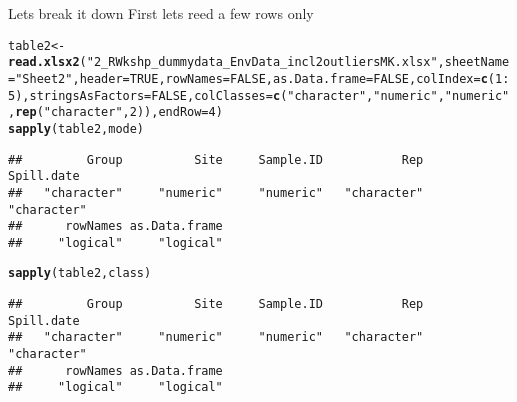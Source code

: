 \documentclass[12pt]{beamer}\usepackage[]{graphicx}\usepackage[]{color}
\makeatletter
\newcommand{\hlnum}[1]{\textcolor[rgb]{0.686,0.059,0.569}{#1}}%
\newcommand{\hlstr}[1]{\textcolor[rgb]{0.192,0.494,0.8}{#1}}%
\newcommand{\hlopt}[1]{\textcolor[rgb]{0,0,0}{#1}}%
\newcommand{\hlstd}[1]{\textcolor[rgb]{0.345,0.345,0.345}{#1}}%
\newcommand{\hlkwb}[1]{\textcolor[rgb]{0.69,0.353,0.396}{#1}}%
\newcommand{\hlkwc}[1]{\textcolor[rgb]{0.333,0.667,0.333}{#1}}%
\newcommand{\hlkwd}[1]{\textcolor[rgb]{0.737,0.353,0.396}{\textbf{#1}}}%
\newenvironment{kframe}{%
 \def\at@end@of@kframe{}%
 \ifinner\ifhmode%
  \def\at@end@of@kframe{\end{minipage}}%
  \begin{minipage}{\columnwidth}%
 \fi\fi%
 \def\FrameCommand##1{\hskip\@totalleftmargin \hskip-\fboxsep
 \colorbox{shadecolor}{##1}\hskip-\fboxsep
     \hskip-\linewidth \hskip-\@totalleftmargin \hskip\columnwidth}%
 \MakeFramed {\advance\hsize-\width
   \@totalleftmargin\z@ \linewidth\hsize
   \@setminipage}}%
 {\par\unskip\endMakeFramed%
 \at@end@of@kframe}
\newenvironment{knitrout}{}{} %
\makeatother
\begin{document}
\begin{frame}[fragile]
\begin{block}{Lets break it down}
First lets reed a few rows only
\end{block}
\begin{knitrout}
\color{fgcolor}\begin{kframe}
\begin{alltt}
\hlstd{table2}\hlkwb{<-}\hlkwd{read.xlsx2}\hlstd{(}\hlstr{"2_R Wkshp_dummy data_Env Data_incl2outliersMK.xlsx"}\hlstd{,} \hlkwc{sheetName} \hlstd{=} \hlstr{"Sheet2"}\hlstd{,}\hlkwc{header}\hlstd{=}\hlnum{TRUE}\hlstd{,}\hlkwc{rowNames}\hlstd{=}\hlnum{FALSE}\hlstd{,}\hlkwc{as.Data.frame}\hlstd{=}\hlnum{FALSE}\hlstd{,}\hlkwc{colIndex}\hlstd{=}\hlkwd{c}\hlstd{(}\hlnum{1}\hlopt{:}\hlnum{5}\hlstd{),}\hlkwc{stringsAsFactors}\hlstd{=}\hlnum{FALSE}\hlstd{,}\hlkwc{colClasses}\hlstd{=}\hlkwd{c}\hlstd{(}\hlstr{"character"}\hlstd{,}\hlstr{"numeric"}\hlstd{,}\hlstr{"numeric"}\hlstd{,}\hlkwd{rep}\hlstd{(}\hlstr{"character"}\hlstd{,}\hlnum{2}\hlstd{)),}\hlkwc{endRow}\hlstd{=}\hlnum{4}\hlstd{)}
\hlkwd{sapply}\hlstd{(table2,mode)}
\end{alltt}
\begin{verbatim}
##         Group          Site     Sample.ID           Rep    Spill.date 
##   "character"     "numeric"     "numeric"   "character"   "character" 
##      rowNames as.Data.frame 
##     "logical"     "logical"
\end{verbatim}
\begin{alltt}
\hlkwd{sapply}\hlstd{(table2,class)}
\end{alltt}
\begin{verbatim}
##         Group          Site     Sample.ID           Rep    Spill.date 
##   "character"     "numeric"     "numeric"   "character"   "character" 
##      rowNames as.Data.frame 
##     "logical"     "logical"
\end{verbatim}
\end{kframe}
\end{knitrout}
\clearpage
\end{frame}
\end{document}
